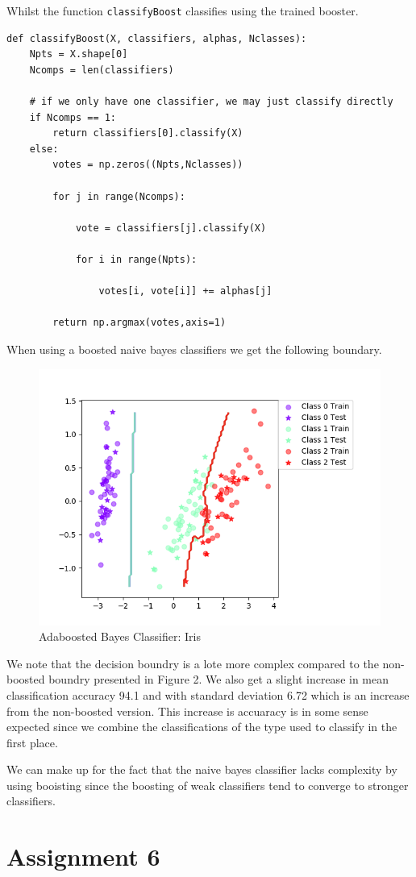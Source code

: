 \documentclass{article}
\begin{document}
Whilst the function \texttt{classifyBoost} classifies using the trained booster.

\begin{lstlisting}
def classifyBoost(X, classifiers, alphas, Nclasses):
    Npts = X.shape[0]
    Ncomps = len(classifiers)

    # if we only have one classifier, we may just classify directly
    if Ncomps == 1:
        return classifiers[0].classify(X)
    else:
        votes = np.zeros((Npts,Nclasses))
        
        for j in range(Ncomps):
            
            vote = classifiers[j].classify(X)
            
            for i in range(Npts):
                
                votes[i, vote[i]] += alphas[j]
            
        return np.argmax(votes,axis=1)
\end{lstlisting}

When using a boosted naive bayes classifiers we get the following boundary.
        
\begin{figure}
    \centering
    \includegraphics[scale = 0.90]{BoostedBayesIrirs.png}
    \caption{Adaboosted Bayes Classifier: Iris}
\end{figure}

We note that the decision boundry is a lote more complex compared to the non-boosted boundry presented in Figure 2. We also get a slight increase in mean classification accuracy 94.1 and with standard deviation 6.72 which is an increase from the non-boosted version. This increase is accuaracy is in some sense expected since we combine the classifications of the type used to classify in the first place. 

We can make up for the fact that the naive bayes classifier lacks complexity by using booisting since the boosting of weak classifiers tend to converge to stronger classifiers.

\section*{Assignment 6}
\end{document}
